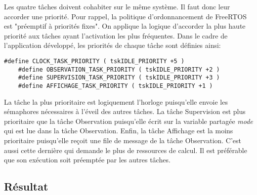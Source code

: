 Les quatre tâches doivent cohabiter sur le même système.
Il faut donc leur accorder une priorité.
Pour rappel, la politique d'ordonnancement de FreeRTOS est "préemptif à priorités fixes".
On applique la logique d'accorder la plus haute priorité aux tâches ayant l'activation les plus fréquentes.
Dans le cadre de l'application développé, les priorités de chaque tâche sont définies ainsi:
\begin{lstlisting}[style=CStyle]
    #define CLOCK_TASK_PRIORITY ( tskIDLE_PRIORITY +5 ) 
    #define OBSERVATION_TASK_PRIORITY ( tskIDLE_PRIORITY +2 )
    #define SUPERVISION_TASK_PRIORITY ( tskIDLE_PRIORITY +3 )
    #define AFFICHAGE_TASK_PRIORITY ( tskIDLE_PRIORITY +1 )
\end{lstlisting}
La tâche la plus prioritaire est logiquement l'horloge puisqu'elle envoie les sémaphores nécessaires à l'éveil des autres tâches.
La tâche Supervision est plus prioritaire que la tâche Observation puisqu'elle écrit sur la variable partagée \textit{mode} qui est lue dans la tâche Observation.
Enfin, la tâche Affichage est la moins prioritaire puisqu'elle reçoit une file de message de la tâche Observation.
C'est aussi cette dernière qui demande le plus de ressources de calcul.
Il est préférable que son exécution soit préemptée par les autres tâches.

\subsection{Résultat}

